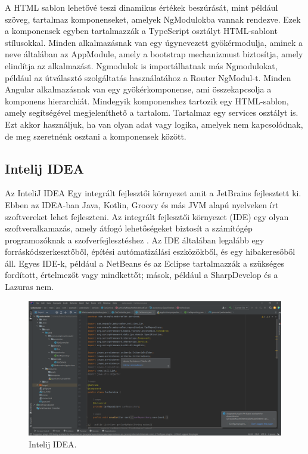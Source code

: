 A HTML sablon lehetővé teszi dinamikus értékek beszúrását, mint például szöveg, tartalmaz komponenseket, amelyek NgModulokba vannak rendezve. Ezek a komponensek egyben tartalmazzák a TypeScript osztályt HTML-sablont stílusokkal. Minden alkalmazásnak van egy úgynevezett gyökérmodulja, aminek a neve általában az AppModule, amely a bootstrap mechanizmust biztosítja, amely elindítja az alkalmazást. Ngmodulok is importálhatnak más Ngmodulokat, például az útválasztó szolgáltatás használatához a Router NgModul-t.  Minden Angular alkalmazásnak van egy gyökérkomponense, ami összekapcsolja a komponens hierarchiát. Mindegyik komponenshez tartozik egy HTML-sablon, amely segítségével megjeleníthető a tartalom. Tartalmaz egy services osztályt is. Ezt akkor használjuk, ha van olyan adat vagy logika, amelyek nem kapcsolódnak, de meg szeretnénk osztani a komponensek között\cite{Angular}.


\subsection{Intelij IDEA}

Az InteliJ IDEA \cite{Intelij} Egy integrált fejlesztői környezet \cite{Intelij2} amit a JetBrains fejlesztett ki. Ebben az IDEA-ban Java, Kotlin, Groovy és más JVM alapú nyelveken írt szoftvereket lehet fejleszteni. Az integrált fejlesztői környezet (IDE)  egy olyan  szoftveralkamazás, amely átfogó lehetőségeket biztosít a számítógép programozóknak a szofverfejlesztéshez . Az IDE általában legalább egy forráskódszerkesztőből, építési autómatizálási eszközökből, és egy hibakeresőből áll. Egyes IDE-k, például a NetBeans és az Eclipse tartalmazzák a szükséges fordított, értelmezőt vagy mindkettőt; mások, például a SharpDevelop és a Lazuras nem.

\begin{figure}[h]
\centering
\includegraphics[scale=1]{images/Intelij.png}
\caption{Intelij IDEA.}
\label{fig:Intelij}
\end{figure}

